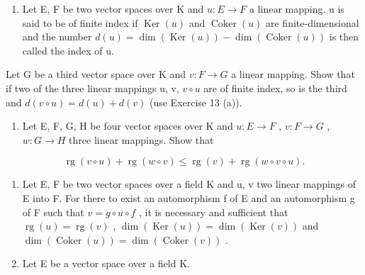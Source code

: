 \begin{enumerate}
\def\labelenumi{\arabic{enumi}.}
\setcounter{enumi}{15}
\tightlist
\item
  Let E, F be two vector spaces over K and \(u: E \to F\) a linear mapping. u is said to be of finite index if \(\operatorname{Ker}(u)\) and \(\operatorname{Coker}(u)\) are finite-dimensional and the number \(d(u) = \dim(\operatorname{Ker}(u)) - \dim(\operatorname{Coker}(u))\) is then called the index of u.
\end{enumerate}

Let G be a third vector space over K and \(v: F \rightarrow G\) a linear mapping. Show that if two of the three linear mappings u, v, \(v \circ u\) are of finite index, so is the third and \(d(v \circ u) = d(u) + d(v)\) (use Exercise 13 (a)).

\begin{enumerate}
\def\labelenumi{\arabic{enumi}.}
\setcounter{enumi}{16}
\tightlist
\item
  Let E, F, G, H be four vector spaces over K and \(u: E \rightarrow F\) , \(v: F \rightarrow G\) , \(w: G \rightarrow H\) three linear mappings. Show that
\end{enumerate}

\[
\operatorname{rg} (v \circ u) + \operatorname{rg} (w \circ v) \leqslant \operatorname{rg} (v) + \operatorname{rg} (w \circ v \circ u).
\]

\begin{enumerate}
\def\labelenumi{\arabic{enumi}.}
\setcounter{enumi}{17}
\item
  Let E, F be two vector spaces over a field K and u, v two linear mappings of E into F. For there to exist an automorphism f of E and an automorphism g of F such that \(v = g \circ u \circ f\) , it is necessary and sufficient that \(\operatorname{rg}(u) = \operatorname{rg}(v)\) , \(\dim(\operatorname{Ker}(u)) = \dim(\operatorname{Ker}(v))\) and \(\dim(\operatorname{Coker}(u)) = \dim(\operatorname{Coker}(v))\) .
\item
  Let E be a vector space over a field K.
\end{enumerate}

